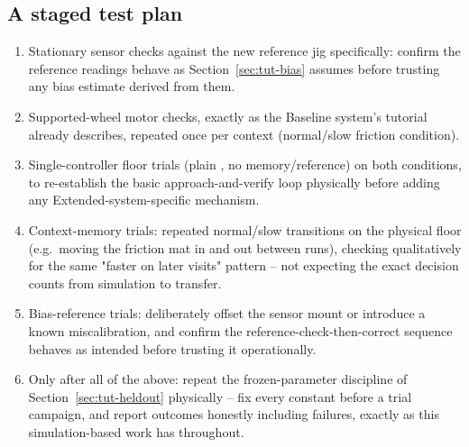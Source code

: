\documentclass[11pt,a4paper]{article}
\newcommand{\code}[1]{\texttt{\detokenize{#1}}}
\begin{document}
\subsection{A staged test plan}
\begin{enumerate}
\item Stationary sensor checks against the new reference jig specifically: confirm the reference readings behave as Section~\ref{sec:tut-bias} assumes before trusting any bias estimate derived from them.
\item Supported-wheel motor checks, exactly as the Baseline system's tutorial already describes, repeated once per context (normal/slow friction condition).
\item Single-controller floor trials (plain \code{ext1}, no memory/reference) on both conditions, to re-establish the basic approach-and-verify loop physically before adding any Extended-system-specific mechanism.
\item Context-memory trials: repeated normal/slow transitions on the physical floor (e.g.\ moving the friction mat in and out between runs), checking qualitatively for the same "faster on later visits" pattern -- not expecting the exact decision counts from simulation to transfer.
\item Bias-reference trials: deliberately offset the sensor mount or introduce a known miscalibration, and confirm the reference-check-then-correct sequence behaves as intended before trusting it operationally.
\item Only after all of the above: repeat the frozen-parameter discipline of Section~\ref{sec:tut-heldout} physically -- fix every constant before a trial campaign, and report outcomes honestly including failures, exactly as this simulation-based work has throughout.
\end{enumerate}
\end{document}
